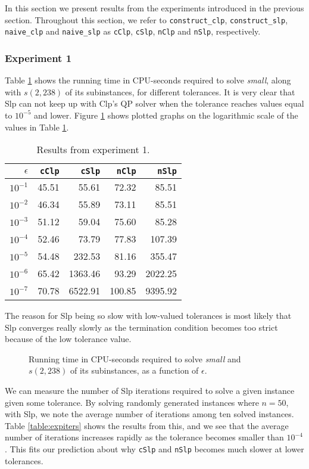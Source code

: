 In this section we present results from the experiments introduced in the
previous section. Throughout this section, we refer to
\texttt{construct\_clp}, \texttt{construct\_slp}, \texttt{naive\_clp} and
\texttt{naive\_slp} as \texttt{cClp}, \texttt{cSlp}, \texttt{nClp} and
\texttt{nSlp}, respectively.

\subsubsection{Experiment 1}
Table \ref{table:expone} shows the running time in CPU-seconds required
to solve \textit{small}, along with $s(2, 238)$ of its subinstances, for
different tolerances.
It is very clear that Slp can not
keep up with Clp's QP solver when the tolerance reaches values equal to
$10^{-5}$ and lower.
Figure \ref{fig:smalltolerance} shows plotted graphs on the logarithmic scale
of the values in Table \ref{table:expone}.

\begin{table}[ht!]
\centering
\caption{Results from experiment 1.}
\begin{tabular}{rrrrr}
$\epsilon$ & \texttt{cClp} & \texttt{cSlp} & \texttt{nClp} & \texttt{nSlp} \\ \hline
$10^{-1}$ & 45.51 & 55.61 & 72.32 & 85.51 \\
$10^{-2}$ & 46.34 & 55.89 & 73.11 & 85.51 \\
$10^{-3}$ & 51.12 & 59.04 & 75.60 & 85.28 \\
$10^{-4}$ & 52.46 & 73.79 & 77.83 & 107.39 \\
$10^{-5}$ & 54.48 & 232.53 & 81.16 & 355.47 \\
$10^{-6}$ & 65.42 & 1363.46 & 93.29 & 2022.25 \\
$10^{-7}$ & 70.78 & 6522.91 & 100.85 & 9395.92
\end{tabular}
\label{table:expone}
\end{table}

The reason for Slp being so slow with low-valued tolerances is most likely that
Slp converges really slowly as the termination condition becomes too strict
because of the low tolerance value.
\begin{figure}[ht!]
    \centering
    
    \caption{Running time in CPU-seconds required to solve \textit{small}
             and $s(2, 238)$ of its subinstances, as a function of $\epsilon$.}
    \label{fig:smalltolerance}
\end{figure}
We can measure the number of Slp iterations required to solve a given instance
given some tolerance. By solving randomly generated instances where $n = 50$,
with Slp, we note the average number of iterations among ten solved
instances. Table \ref{table:expiters} shows the results from this, and we see
that the average number of iterations increases rapidly as the tolerance
becomes smaller than $10^{-4}$. This fits our prediction about why
\texttt{cSlp} and \texttt{nSlp} becomes much slower at lower tolerances.

